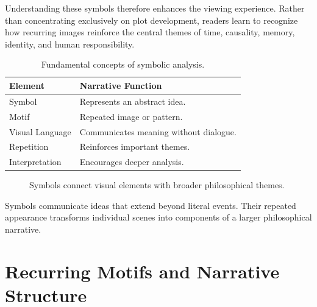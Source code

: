 \documentclass[12pt,oneside,openany]{book}
\begin{document}
Understanding these symbols therefore enhances the viewing experience. Rather
than concentrating exclusively on plot development, readers learn to recognize
how recurring images reinforce the central themes of time, causality, memory,
identity, and human responsibility.

\begin{table}[H]
\centering
\begin{tabular}{|p{4cm}|p{8cm}|}
\hline
\textbf{Element} & \textbf{Narrative Function}\\
\hline
Symbol & Represents an abstract idea.\\
\hline
Motif & Repeated image or pattern.\\
\hline
Visual Language & Communicates meaning without dialogue.\\
\hline
Repetition & Reinforces important themes.\\
\hline
Interpretation & Encourages deeper analysis.\\
\hline
\end{tabular}
\caption{Fundamental concepts of symbolic analysis.}
\end{table}

\begin{figure}[H]
\centering
{}

\caption{Symbols connect visual elements with broader philosophical themes.}
\end{figure}

\begin{tcolorbox}[colback=gray!8,colframe=black,title=Key Observation]
Symbols communicate ideas that extend beyond literal events. Their repeated
appearance transforms individual scenes into components of a larger
philosophical narrative.
\end{tcolorbox}
\section{Recurring Motifs and Narrative Structure}
\end{document}

